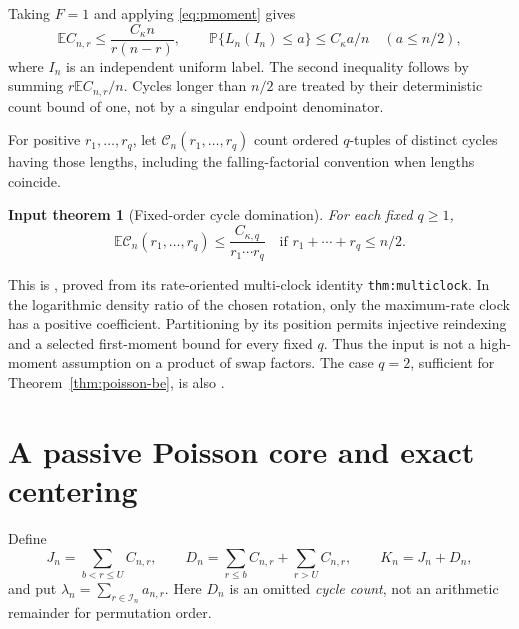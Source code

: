 \documentclass[11pt]{article}
\newcommand{\E}{\mathbb E}
\newcommand{\Pp}{\mathbb P}
\newtheorem{inputtheorem}[theorem]{Input theorem}
\theoremstyle{remark}
\begin{document}
Taking $F=1$ and applying \eqref{eq:pmoment} gives
\begin{equation}\label{eq:crude}
 \E C_{n,r}\le\frac{C_\kappa n}{r(n-r)},\qquad
 \Pp\{L_n(I_n)\le a\}\le C_\kappa a/n\quad(a\le n/2),
\end{equation}
where $I_n$ is an independent uniform label. The second inequality follows by summing $r\E C_{n,r}/n$. Cycles longer than $n/2$ are treated by their deterministic count bound of one, not by a singular endpoint denominator.

For positive $r_1,\ldots,r_q$, let $\mathcal C_n(r_1,\ldots,r_q)$ count ordered $q$-tuples of distinct cycles having those lengths, including the falling-factorial convention when lengths coincide.
\begin{inputtheorem}[Fixed-order cycle domination]\label{input:factorial}
For each fixed $q\ge1$,
\begin{equation}\label{eq:factorial}
 \E\mathcal C_n(r_1,\ldots,r_q)\le\frac{C_{\kappa,q}}{r_1\cdots r_q}
 \quad\text{if }r_1+\cdots+r_q\le n/2.
\end{equation}
\end{inputtheorem}
This is \cite[\texttt{cor:factorial-domination}]{OrderQuant}, proved from its rate-oriented multi-clock identity \texttt{thm:multiclock}. In the logarithmic density ratio of the chosen rotation, only the maximum-rate clock has a positive coefficient. Partitioning by its position permits injective reindexing and a selected first-moment bound for every fixed $q$. Thus the input is not a high-moment assumption on a product of swap factors. The case $q=2$, sufficient for Theorem~\ref{thm:poisson-be}, is also \cite[\texttt{cor:pair}]{Order}.

\section{A passive Poisson core and exact centering}\label{sec:core}
Define
\[
 J_n=\sum_{b<r\le U}C_{n,r},\qquad
 D_n=\sum_{r\le b}C_{n,r}+\sum_{r>U}C_{n,r},\qquad K_n=J_n+D_n,
\]
and put $\lambda_n=\sum_{r\in\mathcal I_n}a_{n,r}$. Here $D_n$ is an omitted \emph{cycle count}, not an arithmetic remainder for permutation order.
\end{document}
